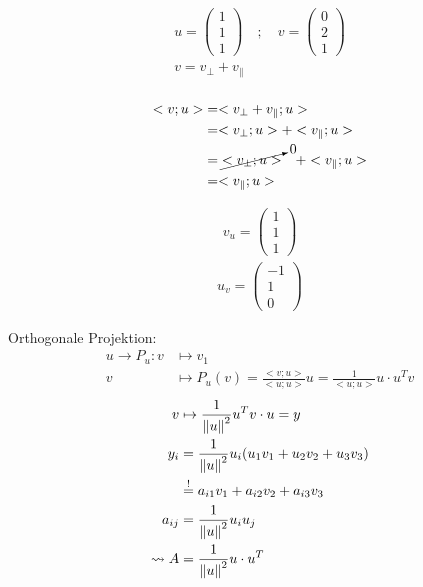 \begin{equation}\begin{split}
	u = \begin{pmatrix*}1\\1\\1\end{pmatrix*}\quad;\quad
	v = \begin{pmatrix*}0\\2\\1\end{pmatrix*}\\
	v = v_{\bot} + v_{\parallel}\\\\
\end{split}\end{equation}
\begin{equation}\begin{split}
	<v; u>
	&= <v_{\bot} + v_{\parallel}; u>\\
	&= <v_{\bot}; u> + <v_{\parallel}; u>\\
	&= \cancelto{0}{<v_{\bot}; u>} \quad + <v_{\parallel}; u>\\
	&= <v_{\parallel}; u>\\
\end{split}\end{equation}

\begin{equation}\begin{split}
	v_u = \begin{pmatrix*}1\\1\\1\end{pmatrix*}
\end{split}\end{equation}
\begin{equation}\begin{split}
	u_v = \begin{pmatrix*}-1\\1\\0\end{pmatrix*}
\end{split}\end{equation}

Orthogonale Projektion:
\begin{equation}\begin{split}
	u \rightarrow P_u : v &\mapsto v_1\\
	v &\mapsto P_u(v) = \frac{<v;u>}{<u;u>} u = \frac{1}{<u;u>} u \cdot u^T v
\end{split}\end{equation}
\begin{equation}\begin{split}
	v &\mapsto \frac{1}{\left\lVert u\right\rVert^2}u^T v \cdot u = y\\
	y_i &= \frac{1}{\left\lVert u\right\rVert^2}u_i(u_1v_1 + u_2v_2 + u_3v_3)\\
	&\stackrel{!}{=} a_{i1}v_1 + a_{i2}v_2 + a_{i3}v_3\\
	a_{ij} &= \frac{1}{\left\lVert u\right\rVert^2} u_iu_j \\
	\leadsto A &= \frac{1}{\left\lVert u\right\rVert^2} u \cdot u^T
\end{split}\end{equation}

